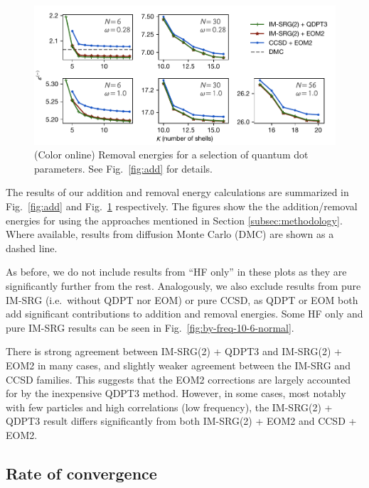 \begin{figure}
  \centering
  \includegraphics{fig-rm2.pdf}
  \caption{(Color online) Removal energies for a selection of quantum dot parameters.  See Fig.\ \ref{fig:add} for details.}
  \label{fig:rm}
\end{figure}

The results of our addition and removal energy calculations are summarized in Fig.\ \ref{fig:add} and Fig.\ \ref{fig:rm} respectively.  The figures show the the addition/removal energies for using the approaches mentioned in Section \ref{subsec:methodology}.  Where available, results from diffusion Monte Carlo (DMC) \cite{PhysRevB.84.115302} are shown as a dashed line.

As before, we do not include results from ``HF only'' in these plots as they are significantly further from the rest.  Analogously, we also exclude results from pure IM-SRG (i.e.\ without QDPT nor EOM) or pure CCSD, as QDPT or EOM both add significant contributions to addition and removal energies.  Some HF only and pure IM-SRG results can be seen in Fig.\ \ref{fig:by-freq-10-6-normal}.

There is strong agreement between IM-SRG(2) + QDPT3 and IM-SRG(2) + EOM2 in many cases, and slightly weaker agreement between the IM-SRG and CCSD families.  This suggests that the EOM2 corrections are largely accounted for by the inexpensive QDPT3 method.  However, in some cases, most notably with few particles and high correlations (low frequency), the IM-SRG(2) + QDPT3 result differs significantly from both IM-SRG(2) + EOM2 and CCSD + EOM2.

\subsection{Rate of convergence}

